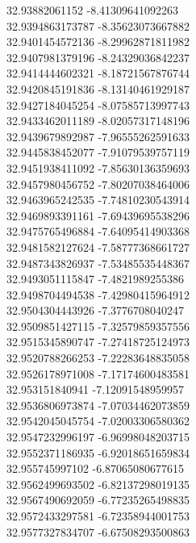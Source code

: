 {32.93882061152	-8.41309641092263\\
32.9394863173787	-8.35623073667882\\
32.9401454572136	-8.29962871811982\\
32.9407981379196	-8.24329036842237\\
32.9414444602321	-8.18721567876744\\
32.9420845191836	-8.13140461929187\\
32.9427184045254	-8.07585713997743\\
32.9433462011189	-8.02057317148196\\
32.9439679892987	-7.96555262591633\\
32.9445838452077	-7.91079539757119\\
32.9451938411092	-7.85630136359693\\
32.9457980456752	-7.80207038464006\\
32.9463965242535	-7.74810230543914\\
32.9469893391161	-7.69439695538296\\
32.9475765496884	-7.64095414903368\\
32.9481582127624	-7.58777368661727\\
32.9487343826937	-7.53485535448367\\
32.9493051115847	-7.4821989255386\\
32.9498704494538	-7.42980415964912\\
32.9504304443926	-7.3776708040247\\
32.9509851427115	-7.32579859357556\\
32.9515345890747	-7.27418725124973\\
32.9520788266253	-7.22283648835058\\
32.9526178971008	-7.17174600483581\\
32.953151840941	-7.12091548959957\\
32.9536806973874	-7.07034462073859\\
32.9542045045754	-7.02003306580362\\
32.9547232996197	-6.96998048203715\\
32.9552371186935	-6.92018651659834\\
32.955745997102	-6.87065080677615\\
32.9562499693502	-6.82137298019135\\
32.9567490692059	-6.77235265498835\\
32.9572433297581	-6.72358944001753\\
32.9577327834707	-6.67508293500863\\
}
